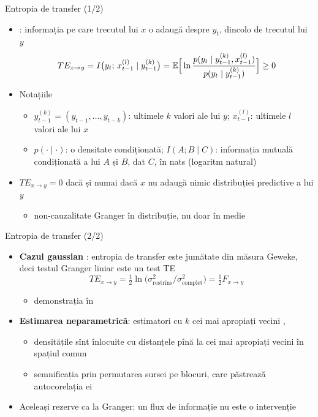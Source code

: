 \begin{frame}{Entropia de transfer (1/2)}
\itemsize{\small}
\begin{itemize}
    \item {}: informația pe care trecutul lui $x$ o adaugă despre $y_t$, dincolo de trecutul lui $y$ \[ TE_{x\to y} = I\big(y_t;\, x_{t-1}^{(l)} \mid y_{t-1}^{(k)}\big) = \mathbb{E}\Big[\ln\dfrac{p(y_t\mid y^{(k)}_{t-1}, x^{(l)}_{t-1})}{p(y_t\mid y^{(k)}_{t-1})}\Big] \ge 0 \]
    \item Notațiile
    \begin{itemize}
        \item $y^{(k)}_{t-1} = (y_{t-1}, \dots, y_{t-k})$: ultimele $k$ valori ale lui $y$; $x^{(l)}_{t-1}$: ultimele $l$ valori ale lui $x$
        \item $p(\cdot\mid\cdot)$: o densitate condiționată; $I(A; B\mid C)$: informația mutuală condiționată a lui $A$ și $B$, dat $C$, în nats (logaritm natural)
    \end{itemize}
    \item $TE_{x\to y} = 0$ dacă și numai dacă $x$ nu adaugă nimic distribuției predictive a lui $y$
    \begin{itemize}
        \item non-cauzalitate Granger în distribuție, nu doar în medie
    \end{itemize}
\end{itemize}
\end{frame}

\begin{frame}{Entropia de transfer (2/2)}
\itemsize{\small}
\begin{itemize}
    \item \textbf{Cazul gaussian} : entropia de transfer este jumătate din măsura Geweke, deci testul Granger liniar este un test TE \[ TE_{x\to y} = \tfrac12\ln\big(\sigma^2_{\mathrm{restrîns}}/\sigma^2_{\mathrm{complet}}\big) = \tfrac12 F_{x\to y} \]
    \begin{itemize}
        \item demonstrația în 
    \end{itemize}
    \item \textbf{Estimarea neparametrică}: estimatori cu $k$ cei mai apropiați vecini , 
    \begin{itemize}
        \item densitățile sînt înlocuite cu distanțele pînă la cei mai apropiați vecini în spațiul comun
        \item semnificația prin permutarea sursei pe blocuri, care păstrează autocorelația ei
    \end{itemize}
    \item Aceleași rezerve ca la Granger: un flux de informație nu este o intervenție
\end{itemize}
\end{frame}

